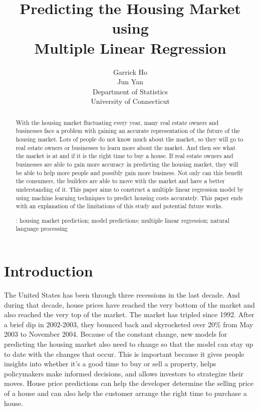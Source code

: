 \documentclass[12pt]{article}
\title{Predicting the Housing Market using \\  Multiple Linear Regression}
\author{Garrick Ho\\
  Jun Yan\\[1ex]
  Department of Statistics\\
  University of Connecticut\\
}
\begin{document}
\maketitle
\doublespace

\begin{abstract}
With the housing market fluctuating every year, many real estate owners and businesses face a problem with gaining an accurate representation of the future of the housing market. Lots of people do not know much about the market, so they will go to real estate owners or businesses to learn more about the market. And then see what the market is at and if it is the right time to buy a house. If real estate owners and businesses are able to gain more accuracy in predicting the housing market, they will be able to help more people and possibly gain more business. Not only can this benefit the consumers, the builders are able to move with the market and have a better understanding of it. This paper aims to construct a multiple linear regression model by using machine learning techniques to predict housing costs accurately. This paper ends with an explanation of the limitations of this study and potential future works.

\bigskip
{}:
housing market prediction;
model predictions;
multiple linear regression;
natural language processing


\end{abstract}

\section{Introduction}
\label{sec:intro}


The United States has been through three recessions in the last decade. And during that decade, house prices have reached the very bottom of the market and also reached the very top of the market. The market has tripled since 1992. After a brief dip in 2002-2003, they bounced back and skyrocketed over 20\% from May 2003 to November 2004. \cite{Jacobsen2005} Because of the constant change, new models for predicting the housing market also need to change so that the model can stay up to date with the changes that occur. This is important because it gives people insights into whether it's a good time to buy or sell a property, helps policymakers make informed decisions, and allows investors to strategize their moves. House price predictions can help the developer determine the selling price of a house and can also help the customer arrange the right time to purchase a house. \cite{alfiyantin2017} 
\end{document}
